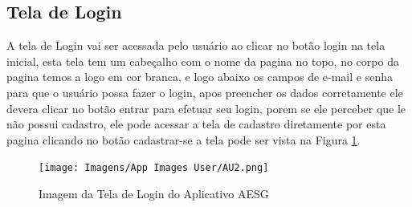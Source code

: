 \documentclass[
    12pt,                   %
    openright,              %
    oneside,                %
    a4paper,                %
    sumario=tradicional,    %
    english,                %
    brazil,                 %
    ]{abntex2}
\begin{document}
        \subsection{Tela de Login}
            A tela de Login vai ser acessada pelo usuário ao clicar no botão login na tela inicial, esta tela tem um cabeçalho com o nome da pagina no topo, no corpo da pagina temos a logo em cor branca, e logo abaixo os campos de e-mail e senha para que o usuário possa fazer o login, apos preencher os dados corretamente ele devera clicar no botão entrar para efetuar seu login, porem se ele perceber que le não possui cadastro, ele pode acessar a tela de cadastro diretamente por esta pagina clicando no botão cadastrar-se a tela pode ser vista na Figura \ref{fig:AppTelaLogin}.
            \begin{figure}[!h]
                \begin{center}
                \centering
                \texttt{[image: Imagens/App Images          User/AU2.png]}
                \end{center}
                \caption[Imagem da Tela de Login do Aplicativo AESG]{ 
                Imagem da Tela de Login do Aplicativo AESG}
                \label{fig:AppTelaLogin}
            \end{figure}
\end{document}
